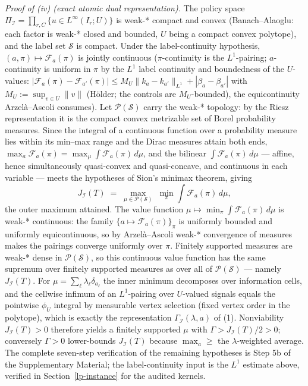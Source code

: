 \documentclass[10pt,twocolumn]{article}
\theoremstyle{plain}
\theoremstyle{definition}
\theoremstyle{remark}
\begin{document}
\emph{Proof of (iv) (exact atomic dual representation).} The policy space
\(\Pi_{\mathcal{I}} = \prod_{r,C}\{u \in L^\infty(I_r; U)\}\) is
weak-* compact and convex (Banach--Alaoglu: each factor is weak-* closed
and bounded, \(U\) being a compact convex polytope), and the label set
\(\mathscr{S}\) is compact. Under the label-continuity hypothesis,
\((a, \pi) \mapsto \mathcal{F}_a(\pi)\) is jointly continuous
(\(\pi\)-continuity is the \(L^1\)-pairing; \(a\)-continuity is
uniform in \(\pi\) by the \(L^1\) label continuity and boundedness of
the \(U\)-values: \(|\mathcal{F}_a(\pi) - \mathcal{F}_{a'}(\pi)| \le
M_U \|k_a - k_{a'}\|_{L^1} + |\beta_a - \beta_{a'}|\) with
\(M_U := \sup_{v \in U} \|v\|\) (H\"older; the controls are
\(M_U\)-bounded), the equicontinuity
Arzel\`a--Ascoli consumes). Let \(\mathcal{P}(\mathscr{S})\) carry the weak-*
topology: by the Riesz representation it is the compact convex metrizable
set of Borel probability measures. Since the integral of a continuous
function over a probability measure lies within its min--max range and
the Dirac measures attain both ends,
\(\max_a \mathcal{F}_a(\pi) = \max_\mu \int
\mathcal{F}_a(\pi)\,d\mu\), and the bilinear
\(\int \mathcal{F}_a(\pi)\,d\mu\) --- affine, hence simultaneously
quasi-convex and quasi-concave, and continuous in each variable --- meets
the hypotheses of Sion's minimax theorem, giving
\[
J_{\mathcal{I}}(T) \;=\; \max_{\mu \in \mathcal{P}(\mathscr{S})}
\; \min_{\pi} \int \mathcal{F}_a(\pi)\,d\mu,
\]
the outer maximum attained. The value function
\(\mu \mapsto \min_\pi \int \mathcal{F}_a(\pi)\,d\mu\) is weak-*
continuous: the family \(\{a \mapsto \mathcal{F}_a(\pi)\}_{\pi}\)
is uniformly bounded and uniformly equicontinuous, so by
Arzel\`a--Ascoli weak-* convergence of measures makes the pairings
converge uniformly over \(\pi\). Finitely supported measures are weak-*
dense in \(\mathcal{P}(\mathscr{S})\), so this continuous value
function has the same supremum over finitely supported measures as over
all of \(\mathcal{P}(\mathscr{S})\) --- namely \(J_{\mathcal{I}}(T)\).
For \(\mu = \sum_\ell \lambda_\ell \delta_{a_\ell}\) the inner
minimum decomposes over information cells, and the cellwise infimum of an
\(L^1\)-pairing over \(U\)-valued signals equals the pointwise
\(\phi_U\) integral by measurable vertex selection (fixed vertex order
in the polytope), which is exactly the representation
\(\Gamma_{\mathcal{I}}(\lambda, a)\) of (1). Nonviability
\(J_{\mathcal{I}}(T) > 0\) therefore yields a finitely supported
\(\mu\) with \(\Gamma > J_{\mathcal{I}}(T)/2 > 0\); conversely
\(\Gamma > 0\) lower-bounds \(J_{\mathcal{I}}(T)\) because
\(\max_a \ge \) the \(\lambda\)-weighted average. The complete
seven-step verification of the remaining hypotheses is Step 5b of the
Supplementary Material; the label-continuity input is the \(L^1\)
estimate above, verified in Section~\ref{lp-instance} for the audited
kernels.
\end{document}
